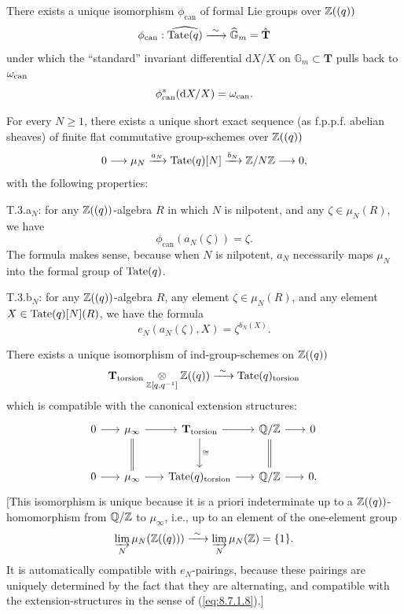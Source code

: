\tateprop\label{tate:2}
There exists a unique isomorphism $\phi_{\mathrm{can}}$ of formal Lie groups over $\mathbb{Z}((q))$
\[
\phi_{\mathrm{can}} : \widehat{\mathrm{Tate}(q)} \xrightarrow{\ \sim\ } \widehat{\mathbb{G}}_m = \hat{\mathbf{T}}
\]
under which the ``standard'' invariant differential $\mathrm{d}X/X$ on $\mathbb{G}_m \subset \mathbf{T}$ pulls back to $\omega_{\mathrm{can}}$
\[
\phi_{\mathrm{can}}^*(\mathrm{d}X/X) = \omega_{\mathrm{can}} .
\]

\tateprop\label{tate:3}
For every $N \ge 1$, there exists a unique short exact sequence (as f.p.p.f. abelian sheaves) of finite flat commutative group-schemes over $\mathbb{Z}((q))$
\[
0 \longrightarrow \mu_N \xrightarrow{a_N} \mathrm{Tate}(q)[N] \xrightarrow{b_N} \mathbb{Z}/N\mathbb{Z} \longrightarrow 0 ,
\]
with the following properties:

T.3.a$_N$: for any $\mathbb{Z}((q))$-algebra $R$ in which $N$ is nilpotent, and any $\zeta \in \mu_N(R)$, we have
\[
\phi_{\mathrm{can}}(a_N(\zeta)) = \zeta .
\]
The formula makes sense, because when $N$ is nilpotent, $a_N$ necessarily maps $\mu_N$ into the formal group of $\mathrm{Tate}(q)$.

T.3.b$_N$: for any $\mathbb{Z}((q))$-algebra $R$, any element $\zeta \in \mu_N(R)$, and any element $X \in \mathrm{Tate}(q)[N](R)$, we have the formula
\[
e_N(a_N(\zeta), X) = \zeta^{b_N(X)} .
\]

\tateprop\label{tate:4}
There exists a unique isomorphism of ind-group-schemes on $\mathbb{Z}((q))$
\[
\mathbf{T}_{\mathrm{torsion}} \underset{\mathbb{Z}[q,q^{-1}]}{\otimes} \mathbb{Z}((q)) \xrightarrow{\ \sim\ } \mathrm{Tate}(q)_{\mathrm{torsion}}
\]
which is compatible with the canonical extension structures:
\[
\begin{tikzcd}[column sep=1.7em, row sep=2.6em]
0 \arrow[r] & \mu_{\infty} \arrow[r] \arrow[d, equal] & \mathbf{T}_{\mathrm{torsion}} \arrow[r] \arrow[d, "\cong"] & \Q/\Z \arrow[r] \arrow[d, equal] & 0 \\
0 \arrow[r] & \mu_{\infty} \arrow[r] & \Tate(q)_{\mathrm{torsion}} \arrow[r] & \Q/\Z \arrow[r] & 0 .
\end{tikzcd}
\]
[This isomorphism is unique because it is a priori indeterminate up to a $\mathbb{Z}((q))$-homomorphism from $\mathbb{Q}/\mathbb{Z}$ to $\mu_{\infty}$, i.e., up to an element of the one-element group
\[
\varinjlim_N \mu_N(\Z((q))) \xrightarrow{\ \sim\ } \varinjlim_N \mu_N(\Z) = \{1\} .
\]
It is automatically compatible with $e_N$-pairings, because these pairings are uniquely determined by the fact that they are alternating, and compatible with the extension-structures in the sense of (\ref{eq:8.7.1.8}).]

